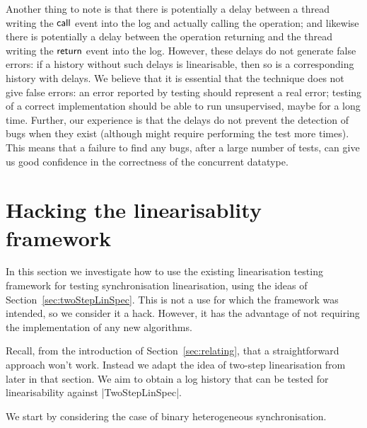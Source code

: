Another thing to note is that there is potentially a delay between a thread
writing the $\mathsf{call}$ event into the log and actually calling the operation; and
likewise there is potentially a delay between the operation returning and the
thread writing the $\mathsf{return}$ event into the log.  However, these delays do not
generate false errors: if a history without such delays is linearisable, then
so is a corresponding history with delays.  We believe that it is essential
that the technique does not give false errors: an error reported by testing
should represent a real error; testing of a correct implementation should be
able to run unsupervised, maybe for a long time.  Further, our experience is
that the delays do not prevent the detection of bugs when they exist (although
might require performing the test more times).  This means that a failure to
find any bugs, after a large number of tests, can give us good confidence in
the correctness of the concurrent datatype.



\section{Hacking the linearisablity framework}
\label{ssec:testing-hacking}


In this section we investigate how to use the existing linearisation testing
framework for testing synchronisation linearisation, using the ideas of
Section~\ref{sec:twoStepLinSpec}.  This is not a use for which the framework
was intended, so we consider it a hack.  However, it has the advantage of not
requiring the implementation of any new algorithms.

Recall, from the introduction of Section~\ref{sec:relating}, that a
straightforward approach won't work.  Instead we adapt the idea of two-step
linearisation from later in that section.  We aim to obtain a log history that
can be tested for linearisability against |TwoStepLinSpec|.

We start by considering the case of binary heterogeneous synchronisation.

